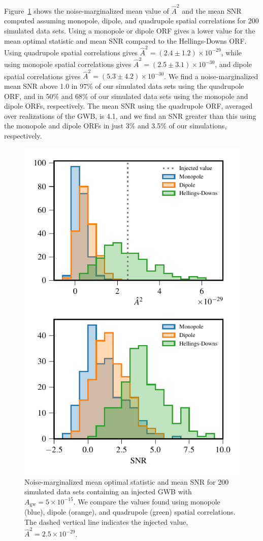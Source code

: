 \documentclass[twocolumn,aps,prd,superscriptaddress]{revtex4-1}
\newcommand{\Agw}{\ensuremath{A_\mathrm{gw}}}
\begin{document}
Figure~\ref{fig:os_ORF} shows the noise-marginalized 
mean value of $\hat{A}^2$ and the mean SNR 
computed assuming monopole, dipole, and quadrupole spatial correlations 
for 200 simulated data sets. Using a monopole or dipole ORF 
gives a lower value for the mean optimal statistic and mean SNR compared to the 
Hellings-Downs ORF. 
Using quadrupole spatial correlations gives $\hat{A}^2 = (2.4 \pm 1.2) \times 10^{-29}$, 
while using monopole spatial correlations gives $\hat{A}^2 = (2.5 \pm 3.1) \times 10^{-30}$, 
and dipole spatial correlations gives $\hat{A}^2 = (5.3 \pm 4.2) \times 10^{-30}$. 
We find a noise-marginalized mean SNR above 1.0 in 97\% of our simulated data sets 
using the quadrupole ORF, and in 50\% and 68\% of our simulated data sets 
using the monopole and dipole ORFs, respectively. 
The mean SNR using the quadrupole ORF, averaged over realizations of the GWB, is 4.1, 
and we find an SNR greater than this using the monopole and dipole ORFs in just 
3\% and 3.5\% of our simulations, respectively.
\begin{figure}[tb]
	\includegraphics[width=0.9\columnwidth]{plots/optstat_spatial_A5e-15.pdf}
	\caption{Noise-marginalized mean optimal statistic and mean SNR for 200 simulated data sets 
			containing an injected GWB with $\Agw = 5\times10^{-15}$. 
			We compare the values found using monopole (blue), dipole (orange), 
			and quadrupole (green) spatial correlations. 
			The dashed vertical line indicates the injected value, $\hat{A}^2 = 2.5 \times 10^{-29}$.}
	\label{fig:os_ORF}
\end{figure}
\end{document}
